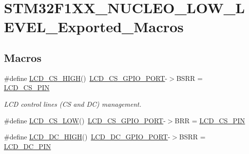 \hypertarget{group___s_t_m32_f1_x_x___n_u_c_l_e_o___l_o_w___l_e_v_e_l___exported___macros}{}\section{S\+T\+M32\+F1\+X\+X\+\_\+\+N\+U\+C\+L\+E\+O\+\_\+\+L\+O\+W\+\_\+\+L\+E\+V\+E\+L\+\_\+\+Exported\+\_\+\+Macros}
\label{group___s_t_m32_f1_x_x___n_u_c_l_e_o___l_o_w___l_e_v_e_l___exported___macros}
\subsection*{Macros}
\begin{DoxyCompactItemize}
\item 
\#define \mbox{\hyperlink{group___s_t_m32_f1_x_x___n_u_c_l_e_o___l_o_w___l_e_v_e_l___exported___macros_gaac8fef3913f432c818b6564644b0dd85}{L\+C\+D\+\_\+\+C\+S\+\_\+\+H\+I\+GH}}()~\mbox{\hyperlink{group___s_t_m32_f1_x_x___n_u_c_l_e_o___l_o_w___l_e_v_e_l___exported___constants_gacd6d9762c06baa185975179e4f6135d6}{L\+C\+D\+\_\+\+C\+S\+\_\+\+G\+P\+I\+O\+\_\+\+P\+O\+RT}}-\/$>$B\+S\+RR = \mbox{\hyperlink{group___s_t_m32_f1_x_x___n_u_c_l_e_o___l_o_w___l_e_v_e_l___exported___constants_ga50d72083b1ed4dd0bc2eaabb4a0332c8}{L\+C\+D\+\_\+\+C\+S\+\_\+\+P\+IN}}
\begin{DoxyCompactList}\small\item\em L\+CD control lines (CS and DC) management. \end{DoxyCompactList}\item 
\#define \mbox{\hyperlink{group___s_t_m32_f1_x_x___n_u_c_l_e_o___l_o_w___l_e_v_e_l___exported___macros_gad781fb7302672d9360ea7045ab45bb7d}{L\+C\+D\+\_\+\+C\+S\+\_\+\+L\+OW}}()~\mbox{\hyperlink{group___s_t_m32_f1_x_x___n_u_c_l_e_o___l_o_w___l_e_v_e_l___exported___constants_gacd6d9762c06baa185975179e4f6135d6}{L\+C\+D\+\_\+\+C\+S\+\_\+\+G\+P\+I\+O\+\_\+\+P\+O\+RT}}-\/$>$B\+RR = \mbox{\hyperlink{group___s_t_m32_f1_x_x___n_u_c_l_e_o___l_o_w___l_e_v_e_l___exported___constants_ga50d72083b1ed4dd0bc2eaabb4a0332c8}{L\+C\+D\+\_\+\+C\+S\+\_\+\+P\+IN}}
\item 
\#define \mbox{\hyperlink{group___s_t_m32_f1_x_x___n_u_c_l_e_o___l_o_w___l_e_v_e_l___exported___macros_ga5b26bcb5a9168803f8561739d195aa80}{L\+C\+D\+\_\+\+D\+C\+\_\+\+H\+I\+GH}}()~\mbox{\hyperlink{group___s_t_m32_f1_x_x___n_u_c_l_e_o___l_o_w___l_e_v_e_l___exported___constants_gab5a6486a69fe569816e674dfd75390d3}{L\+C\+D\+\_\+\+D\+C\+\_\+\+G\+P\+I\+O\+\_\+\+P\+O\+RT}}-\/$>$B\+S\+RR = \mbox{\hyperlink{group___s_t_m32_f1_x_x___n_u_c_l_e_o___l_o_w___l_e_v_e_l___exported___constants_ga402d8ccd0bb0a6cc377222e75b8e050e}{L\+C\+D\+\_\+\+D\+C\+\_\+\+P\+IN}}

\end{DoxyCompactItemize}
